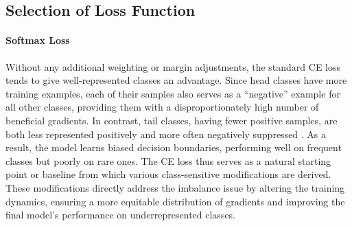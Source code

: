 \subsection{Selection of Loss Function}
\label{sec:loss_selection}


 

\paragraph{Softmax Loss}
Without any additional weighting or margin adjustments, the standard CE loss tends to give well-represented classes an advantage. Since head classes have more training examples, each of their samples also serves as a “negative” example for all other classes, providing them with a disproportionately high number of beneficial gradients. In contrast, tail classes, having fewer positive samples, are both less represented positively and more often negatively suppressed \cite{zhang2023deep, lin2018focallossdenseobject}. As a result, the model learns biased decision boundaries, performing well on frequent classes but poorly on rare ones. The CE loss thus serves as a natural starting point or baseline from which various class-sensitive modifications are derived. These modifications directly address the imbalance issue by altering the training dynamics, ensuring a more equitable distribution of gradients and improving the final model’s performance on underrepresented classes.


